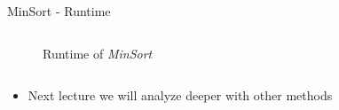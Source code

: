 \begin{frame}{MinSort - Runtime}
\begin{columns}
\begin{column}{0.5\textwidth}
\begin{center}
\begin{figure}[!h]
          \vspace*{-1.0em}\caption{Runtime of \textit{MinSort}}%
          \label{fig:minsort_runtime_2}%
        \end{figure}%
      \end{center}
    \end{column}%
  \end{columns}
  \begin{columns}
    \begin{column}{1.0\textwidth}
      \begin{itemize}
        \item<3- |handout:1>
          Next lecture we will analyze deeper with other methods
      \end{itemize}
    \end{column}
    \begin{column}{0.0\textwidth}\end{column}
  \end{columns}
\end{frame}